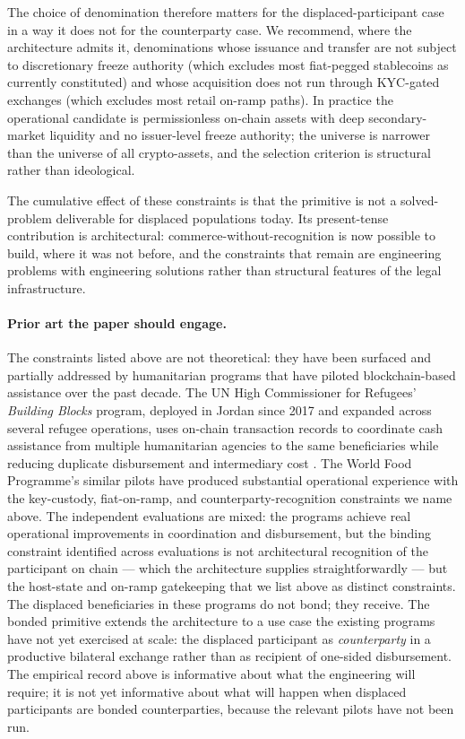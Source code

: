\documentclass[11pt,a4paper]{article}
\theoremstyle{remark}
\begin{document}
The choice of denomination therefore matters for the
displaced-participant case in a way it does not for the
counterparty case. We recommend, where the architecture admits
it, denominations whose issuance and transfer are not subject to
discretionary freeze authority (which excludes most fiat-pegged
stablecoins as currently constituted) and whose acquisition does
not run through KYC-gated exchanges (which excludes most retail
on-ramp paths). In practice the operational candidate is
permissionless on-chain assets with deep secondary-market
liquidity and no issuer-level freeze authority; the universe is
narrower than the universe of all crypto-assets, and the
selection criterion is structural rather than ideological.

The cumulative effect of these constraints is that the primitive
is not a solved-problem deliverable for displaced populations
today. Its present-tense contribution is architectural:
commerce-without-recognition is now possible to build, where it
was not before, and the constraints that remain are engineering
problems with engineering solutions rather than structural
features of the legal infrastructure.

\paragraph{Prior art the paper should engage.}
The constraints listed above are not theoretical: they have been
surfaced and partially addressed by humanitarian programs that
have piloted blockchain-based assistance over the past decade.
The UN High Commissioner for Refugees' \emph{Building Blocks}
program, deployed in Jordan since 2017 and expanded across
several refugee operations, uses on-chain transaction records to
coordinate cash assistance from multiple humanitarian agencies to
the same beneficiaries while reducing duplicate disbursement and
intermediary cost \citep{unhcr2024buildingblocks,
coppi_fast_2019}. The World Food Programme's similar pilots
have produced substantial operational experience with the
key-custody, fiat-on-ramp, and counterparty-recognition
constraints we name above. The independent evaluations
\citep{coppi_fast_2019, caribou_digital_2018} are mixed: the
programs achieve real operational improvements in coordination
and disbursement, but the binding constraint identified across
evaluations is not architectural recognition of the participant
on chain --- which the architecture supplies straightforwardly ---
but the host-state and on-ramp gatekeeping that we list above as
distinct constraints. The displaced beneficiaries in these
programs do not bond; they receive. The bonded primitive
extends the architecture to a use case the existing programs
have not yet exercised at scale: the displaced participant as
\emph{counterparty} in a productive bilateral exchange rather
than as recipient of one-sided disbursement. The empirical
record above is informative about what the engineering will
require; it is not yet informative about what will happen when
displaced participants are bonded counterparties, because the
relevant pilots have not been run.
\end{document}
